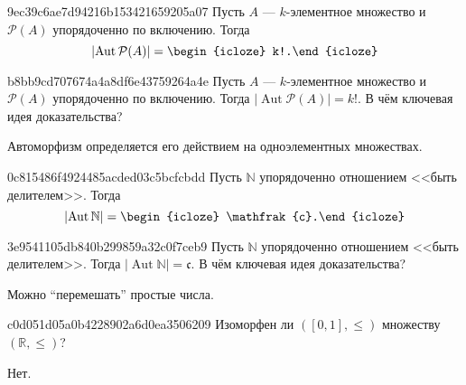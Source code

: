 \begin{note}{9ec39c6ae7d94216b153421659205a07}
    Пусть \({ A }\) --- \({ k }\)-элементное множество и \({ \mathcal P(A) }\) упорядоченно по включению.
    Тогда
    \[
        \left\lvert \operatorname{Aut} \mathcal P(A) \right\rvert = \begin{icloze}{1}k!.\end{icloze}
    \]
\end{note}

\begin{note}{b8bb9cd707674a4a8df6e43759264a4e}
    Пусть \({ A }\) --- \({ k }\)-элементное множество и \({ \mathcal P(A) }\) упорядоченно по включению.
    Тогда \({ \left\lvert \operatorname{Aut} \mathcal P(A) \right\rvert = k! }\).
    В чём ключевая идея доказательства?

    \begin{cloze}{1}
        Автоморфизм определяется его действием на одно\-э\-ле\-мен\-тных множествах.
    \end{cloze}
\end{note}

\begin{note}{0c815486f4924485acded03c5bcfcbdd}
    Пусть \({ \mathbb N }\) упорядоченно отношением <<быть делителем>>.
    Тогда
    \[
        \left\lvert \operatorname{Aut} \mathbb N \right\rvert = \begin{icloze}{1}\mathfrak{c}.\end{icloze}
    \]
\end{note}

\begin{note}{3e9541105db840b299859a32c0f7ceb9}
    Пусть \({ \mathbb N }\) упорядоченно отношением <<быть делителем>>.
    Тогда \({ \left\lvert \operatorname{Aut} \mathbb N \right\rvert = \mathfrak{c} }\).
    В чём ключевая идея доказательства?

    \begin{cloze}{1}
        Можно ``перемешать'' простые числа.
    \end{cloze}
\end{note}

\begin{note}{c0d051d05a0b4228902a6d0ea3506209}
    Изоморфен ли \({ ([0, 1], \leqslant) }\) множеству \({ (\mathbb R, \leqslant) }\)?

    \begin{cloze}{1}
        Нет.
    \end{cloze}
\end{note}

